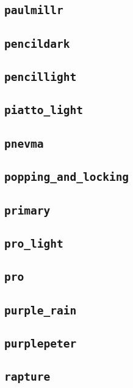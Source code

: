 \subsection{\texttt{paulmillr}}
\newpage
\subsection{\texttt{pencildark}}
\newpage
\subsection{\texttt{pencillight}}
\newpage
\subsection{\texttt{piatto\_light}}
\newpage
\subsection{\texttt{pnevma}}
\newpage
\subsection{\texttt{popping\_and\_locking}}
\newpage
\subsection{\texttt{primary}}
\newpage
\subsection{\texttt{pro\_light}}
\newpage
\subsection{\texttt{pro}}
\newpage
\subsection{\texttt{purple\_rain}}
\newpage
\subsection{\texttt{purplepeter}}
\newpage
\subsection{\texttt{rapture}}
\newpage
